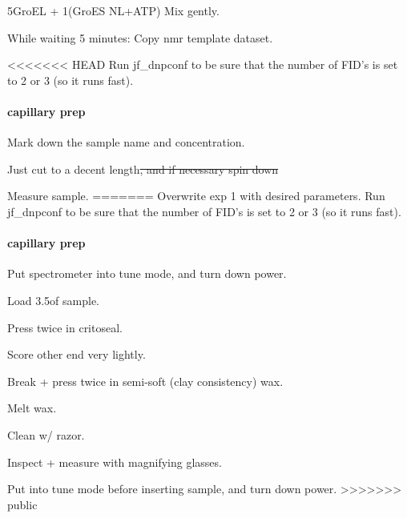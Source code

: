 5\uL GroEL + 1\uL (GroES NL+ATP)
Mix gently.

While waiting 5 minutes:
Copy nmr template dataset.

<<<<<<< HEAD
Run jf\_dnpconf to be sure that the number of FID's is set to 2 or 3 (so it runs fast).

\paragraph{capillary prep}

Mark down the sample name and concentration.

Just cut to a decent length\sout{, and if necessary spin down}

Measure sample.
=======
Overwrite exp 1 with desired parameters.
Run jf\_dnpconf to be sure that the number of FID's is set to 2 or 3 (so it runs fast).

\paragraph{capillary prep}
Put spectrometer into tune mode, and turn down power.

Load 3.5\uL of sample.

Press twice in critoseal.

Score other end very lightly.

Break + press twice in semi-soft (clay consistency) wax.

Melt wax.

Clean w/ razor.

Inspect + measure with magnifying glasses.

Put into tune mode before inserting sample, and turn down power.
>>>>>>> public

